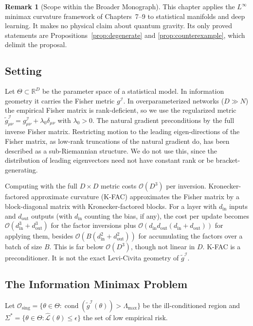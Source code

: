 \documentclass[11pt,reqno]{amsart}
\theoremstyle{definition}
\newtheorem{remark}[theorem]{Remark}
\providecommand{\R}{\mathbb{R}}
\newcommand{\Fisher}{\mathcal{I}}
\newcommand{\Loss}{\mathcal{L}}
\numberwithin{equation}{section}
\providecommand{\R}{\mathbb{R}}
\begin{document}
\begin{remark}[Scope within the Broader Monograph]
This chapter applies the $L^\infty$ minimax curvature framework of Chapters~7--9 to statistical manifolds and deep learning. It makes no physical claim about quantum gravity. Its only proved statements are Propositions~\ref{prop:degenerate} and \ref{prop:counterexample}, which delimit the proposal.
\end{remark}

\subsection{Setting}
Let $\Theta \subset \R^D$ be the parameter space of a statistical model. In information geometry \cite{amari2000} it carries the Fisher metric $g^{\Fisher}$. In overparameterized networks ($D \gg N$) the empirical Fisher matrix is rank-deficient, so we use the regularized metric $\tilde{g}^{\Fisher}_{\mu\nu} = g^{\Fisher}_{\mu\nu} + \lambda_0 \delta_{\mu\nu}$ with $\lambda_0 > 0$. The natural gradient \cite{amari1998} preconditions by the full inverse Fisher matrix. Restricting motion to the leading eigen-directions of the Fisher matrix, as low-rank truncations of the natural gradient do, has been described as a sub-Riemannian structure. We do not use this, since the distribution of leading eigenvectors need not have constant rank or be bracket-generating.

Computing with the full $D \times D$ metric costs $\mathcal{O}(D^3)$ per inversion. Kronecker-factored approximate curvature (K-FAC) \cite{martens2015} approximates the Fisher matrix by a block-diagonal matrix with Kronecker-factored blocks. For a layer with $d_{\mathrm{in}}$ inputs and $d_{\mathrm{out}}$ outputs (with $d_{\mathrm{in}}$ counting the bias, if any), the cost per update becomes $\mathcal{O}(d_{\mathrm{in}}^3 + d_{\mathrm{out}}^3)$ for the factor inversions plus $\mathcal{O}(d_{\mathrm{in}} d_{\mathrm{out}}(d_{\mathrm{in}} + d_{\mathrm{out}}))$ for applying them, besides $\mathcal{O}(B(d_{\mathrm{in}}^2 + d_{\mathrm{out}}^2))$ for accumulating the factors over a batch of size $B$. This is far below $\mathcal{O}(D^3)$, though not linear in $D$. K-FAC is a preconditioner. It is not the exact Levi-Civita geometry of $\tilde g^{\Fisher}$.

\subsection{The Information Minimax Problem}
Let $\mathcal{O}_{\mathrm{sing}} = \{ \theta \in \Theta : \operatorname{cond}(\tilde{g}^{\Fisher}(\theta)) > \Lambda_{\max} \}$ be the ill-conditioned region and $\Sigma^* = \{ \theta \in \Theta : \hat{\Loss}(\theta) \le \epsilon \}$ the set of low empirical risk.
\end{document}
